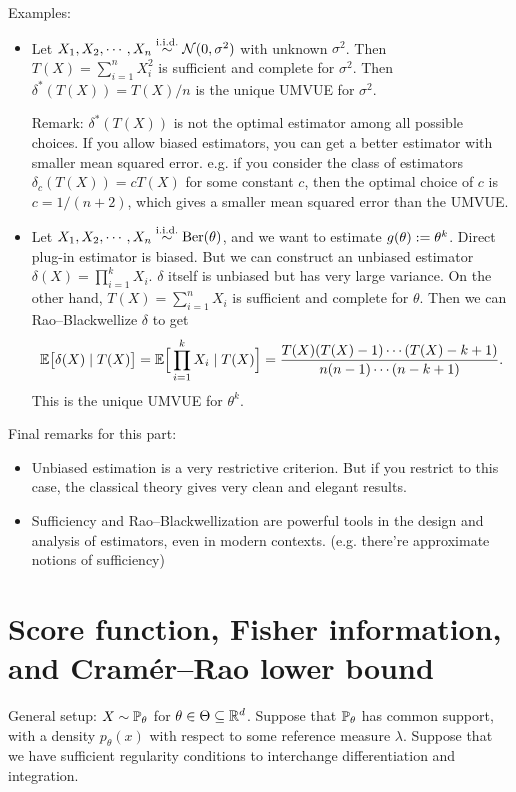 \documentclass[11pt,letterpaper]{article}
\numberwithin{theorem}{lecture}
\numberwithin{proposition}{lecture}
\numberwithin{lemma}{lecture}
\numberwithin{claim}{lecture}
\numberwithin{corollary}{lecture}
\numberwithin{definition}{lecture}
\numberwithin{conjecture}{lecture}
\numberwithin{remark}{lecture}
\numberwithin{example}{lecture}
\numberwithin{equation}{lecture}
\begin{document}
Examples:
\begin{itemize}
  \item Let $X_1, X_2, \cdots, X_n \overset{\mathrm{i.i.d.}}{\sim} \mathcal{N} (0, \sigma^2)$ with unknown $\sigma^2$. Then $T(X) = \sum_{i=1}^n X_i^2$ is sufficient and complete for $\sigma^2$. Then $\delta^* (T(X)) = T(X) / n$ is the unique UMVUE for $\sigma^2$.

  Remark: $\delta^* (T(X))$ is not the optimal estimator among all possible choices. If you allow biased estimators, you can get a better estimator with smaller mean squared error. e.g. if you consider the class of estimators $\delta_c (T(X)) = c T(X)$ for some constant $c$, then the optimal choice of $c$ is $c = 1/(n + 2)$, which gives a smaller mean squared error than the UMVUE.
  \item Let $X_1, X_2, \cdots, X_n \overset{\mathrm{i.i.d.}}{\sim} \mathrm{Ber} (\theta)$, and we want to estimate $g (\theta) := \theta^k$. Direct plug-in estimator is biased. But we can construct an unbiased estimator $\delta (X) = \prod_{i=1}^k X_i$. $\delta$ itself is unbiased but has very large variance. On the other hand, $T(X) = \sum_{i=1}^n X_i$ is sufficient and complete for $\theta$. Then we can Rao--Blackwellize $\delta$ to get
  \begin{align*}
    {\mathbb{E}} \big[ \delta (X) \mid T (X) \big] = {\mathbb{E}} \Big[ \prod_{i=1}^k X_i \mid T(X) \Big] = \frac{T(X) (T(X) - 1) \cdots (T(X) - k + 1)}{n (n - 1) \cdots (n - k + 1)}.
  \end{align*}
  This is the unique UMVUE for $\theta^k$.
\end{itemize}
Final remarks for this part:
\begin{itemize}
\item Unbiased estimation is a very restrictive criterion. But if you restrict to this case, the classical theory gives very clean and elegant results.
\item Sufficiency and Rao--Blackwellization are powerful tools in the design and analysis of estimators, even in modern contexts. (e.g. there're approximate notions of sufficiency)
\end{itemize}

\section{Score function, Fisher information, and Cram\'{e}r--Rao lower bound}
General setup: $X \sim {\mathbb{P}}_\theta$ for $\theta \in \Theta \subseteq \mathbb{R}^d$. Suppose that ${\mathbb{P}}_\theta$ has common support, with a density $p_\theta (x)$ with respect to some reference measure $\lambda$. Suppose that we have sufficient regularity conditions to interchange differentiation and integration.
\end{document}
